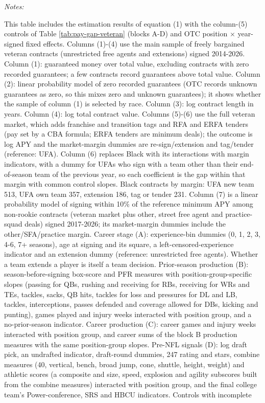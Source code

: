 \begin{table}[!h]
{\begin{threeparttable}
\begin{tabular}[t]{lccccccc}
\end{tabular}
\begin{tablenotes}[para]
\item \textit{Notes:} 
\item This table includes the estimation results of equation (1) with the column-(5) controls of Table \ref{tab:pay-gap-veteran} (blocks A-D) and OTC position $\times$ year-signed fixed effects. Columns (1)-(4) use the main sample of freely bargained veteran contracts (unrestricted free agents and extensions) signed 2014-2026. Column (1): guaranteed money over total value, excluding contracts with zero recorded guarantees; a few contracts record guarantees above total value. Column (2): linear probability model of zero recorded guarantees (OTC records unknown guarantees as zero, so this mixes zero and unknown guarantees); it shows whether the sample of column (1) is selected by race. Column (3): log contract length in years. Column (4): log total contract value. Columns (5)-(6) use the full veteran market, which adds franchise and transition tags and RFA and ERFA tenders (pay set by a CBA formula; ERFA tenders are minimum deals); the outcome is log APY and the market-margin dummies are re-sign/extension and tag/tender (reference: UFA). Column (6) replaces Black with its interactions with margin indicators, with a dummy for UFAs who sign with a team other than their end-of-season team of the previous year, so each coefficient is the gap within that margin with common control slopes. Black contracts by margin: UFA new team 513, UFA own team 357, extension 186, tag or tender 231. Column (7) is a linear probability model of signing within 10\% of the reference minimum APY among non-rookie contracts (veteran market plus other, street free agent and practice-squad deals) signed 2017-2026; its market-margin dummies include the other/SFA/practice margin. Career stage (A): experience-bin dummies (0, 1, 2, 3, 4-6, 7+ seasons), age at signing and its square, a left-censored-experience indicator and an extension dummy (reference: unrestricted free agents). Whether a team extends a player is itself a team decision. Prior-season production (B): season-before-signing box-score and PFR measures with position-group-specific slopes (passing for QBs, rushing and receiving for RBs, receiving for WRs and TEs, tackles, sacks, QB hits, tackles for loss and pressures for DL and LB, tackles, interceptions, passes defended and coverage allowed for DBs, kicking and punting), games played and injury weeks interacted with position group, and a no-prior-season indicator. Career production (C): career games and injury weeks interacted with position group, and career sums of the block B production measures with the same position-group slopes. Pre-NFL signals (D): log draft pick, an undrafted indicator, draft-round dummies, 247 rating and stars, combine measures (40, vertical, bench, broad jump, cone, shuttle, height, weight) and athletic scores (a composite and size, speed, explosion and agility subscores built from the combine measures) interacted with position group, and the final college team's Power-conference, SRS and HBCU indicators. Controls with incomplete 
\end{tablenotes}
\end{threeparttable}}
\end{table}
